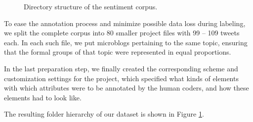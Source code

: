 \begin{figure}
  \begin{minipage}[t][24.5em]{0.5\textwidth}%
    \hspace{3em}
  \end{minipage}

  \begin{minipage}[b]{0.5\textwidth}
  \caption{Directory structure of the sentiment
    corpus.\label{fig:snt:corpus}}%
  \end{minipage}
\end{figure}

To ease the annotation process and minimize possible data loss during
labeling, we split the complete corpus into 80 smaller project files
with 99 -- 109 tweets each.  In each such file, we put microblogs
pertaining to the same topic, ensuring that the formal groups of that
topic were represented in equal proportions.

In the last preparation step, we finally created the corresponding
scheme and customization settings for the project, which specified
what kinds of elements with which attributes were to be annotated by
the human coders, and how these elements had to look like.

The resulting folder hierarchy of our dataset is shown in Figure
\ref{fig:snt:corpus}.

